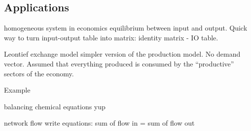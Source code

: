 \begin{card}[1]
    \subsection{Applications}

    \begin{compactdesc}
    \item[homogeneous system in economics] equilibrium between input and
        output. Quick way to turn input-output table into matrix: identity
        matrix - IO table.
    \item[Leontief exchange model] simpler version of the production model.
        No demand vector. Assumed that everything produced is consumed by
        the ``productive'' sectors of the economy.
    \item[Example]
    \item[balancing chemical equations] yup
    \item[network flow] write equations: sum of flow in = sum of flow out
    \end{compactdesc}
\end{card}



